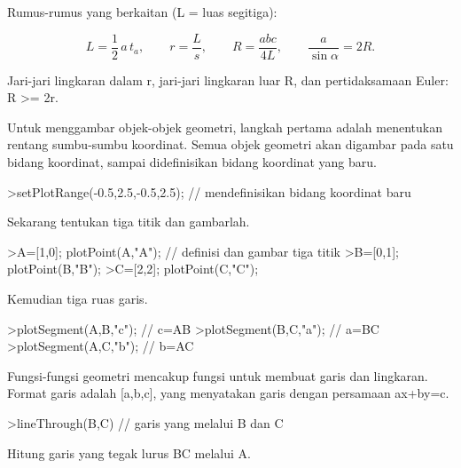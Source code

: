 \documentclass[a4paper,10pt]{article}
\begin{document}
\begin{eulernotebook}
\begin{eulercomment}
\begin{eulercomment}
\begin{eulercomment}
\begin{eulercomment}
\begin{eulercomment}
Rumus-rumus yang berkaitan (L = luas segitiga):
\end{eulercomment}
\begin{eulerformula}
\[
L=\frac{1}{2}\,a\,t_a,\qquad r=\frac{L}{s},\qquad R=\frac{abc}{4L},\qquad \frac{a}{\sin\alpha}=2R.
\]
\end{eulerformula}
\begin{eulercomment}
Jari-jari lingkaran dalam r, jari-jari lingkaran luar R, dan pertidaksamaan Euler: R \textgreater{}= 2r.

\end{eulercomment}
\begin{eulercomment}
Untuk menggambar objek-objek geometri, langkah pertama adalah menentukan rentang sumbu-sumbu
koordinat. Semua objek geometri akan digambar pada satu bidang koordinat, sampai didefinisikan
bidang koordinat yang baru.
\end{eulercomment}
\begin{eulerprompt}
>setPlotRange(-0.5,2.5,-0.5,2.5); // mendefinisikan bidang koordinat baru
\end{eulerprompt}
\begin{eulercomment}
Sekarang tentukan tiga titik dan gambarlah.
\end{eulercomment}
\begin{eulerprompt}
>A=[1,0]; plotPoint(A,"A"); // definisi dan gambar tiga titik
>B=[0,1]; plotPoint(B,"B");
>C=[2,2]; plotPoint(C,"C");
\end{eulerprompt}
\begin{eulercomment}
Kemudian tiga ruas garis.
\end{eulercomment}
\begin{eulerprompt}
>plotSegment(A,B,"c"); // c=AB
>plotSegment(B,C,"a"); // a=BC
>plotSegment(A,C,"b"); // b=AC
\end{eulerprompt}
\begin{eulercomment}
Fungsi-fungsi geometri mencakup fungsi untuk membuat garis dan lingkaran.
Format garis adalah [a,b,c], yang menyatakan garis dengan
persamaan ax+by=c.
\end{eulercomment}
\begin{eulerprompt}
>lineThrough(B,C) // garis yang melalui B dan C
\end{eulerprompt}
\begin{euleroutput}
  [-1,  2,  2]
\end{euleroutput}
\begin{eulercomment}
Hitung garis yang tegak lurus BC melalui A.

\end{eulercomment}
\end{eulercomment}
\end{eulercomment}
\end{eulercomment}
\end{eulercomment}
\end{eulernotebook}
\end{document}
